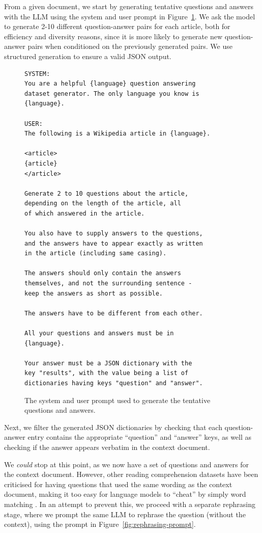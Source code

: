 \documentclass[10pt, a4paper]{article}
\begin{document}
From a given document, we start by generating tentative questions and answers with the LLM using the system and user prompt in Figure~\ref{fig:generation-prompt}. We ask the model to generate 2-10 different question-answer pairs for each article, both for efficiency and diversity reasons, since it is more likely to generate new question-answer pairs when conditioned on the previously generated pairs. We use structured generation to ensure a valid JSON output.

\begin{figure}
\scriptsize
\begin{verbatim}
SYSTEM:
You are a helpful {language} question answering
dataset generator. The only language you know is
{language}.

USER:
The following is a Wikipedia article in {language}.

<article>
{article}
</article>

Generate 2 to 10 questions about the article,
depending on the length of the article, all
of which answered in the article.

You also have to supply answers to the questions,
and the answers have to appear exactly as written
in the article (including same casing).

The answers should only contain the answers
themselves, and not the surrounding sentence -
keep the answers as short as possible.

The answers have to be different from each other.

All your questions and answers must be in
{language}.

Your answer must be a JSON dictionary with the
key "results", with the value being a list of
dictionaries having keys "question" and "answer".
\end{verbatim}
\caption{The system and user prompt used to generate the tentative questions and answers.}
\label{fig:generation-prompt}
\end{figure}

Next, we filter the generated JSON dictionaries by checking that each question-answer entry contains the appropriate ``question'' and ``answer'' keys, as well as checking if the answer appears verbatim in the context document.

We \textit{could} stop at this point, as we now have a set of questions and answers for the context document. However, other reading comprehension datasets have been criticised for having questions that used the same wording as the context document, making it too easy for language models to ``cheat'' by simply word matching \cite{weissenborn2017making, jia2017adversarial}. In an attempt to prevent this, we proceed with a separate rephrasing stage, where we prompt the same LLM to rephrase the question (without the context), using the prompt in Figure~\ref{fig:rephrasing-prompt}.
\end{document}
